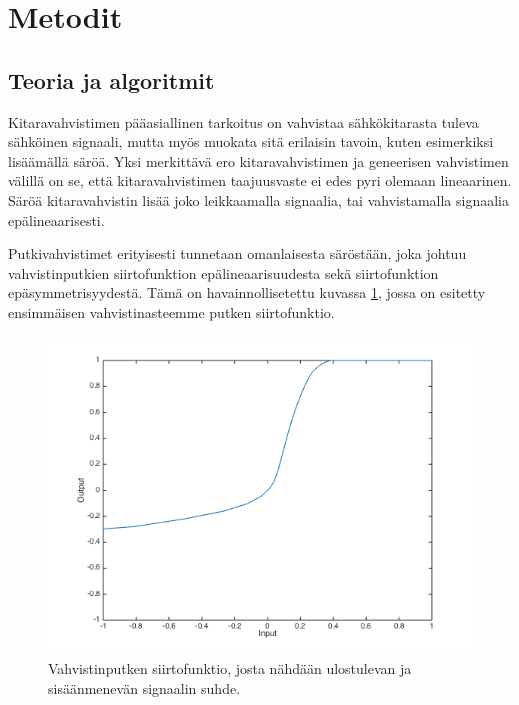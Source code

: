 \documentclass[11pt, a4paper, oneside]{article}
\begin{document}
\section{Metodit}

\subsection{Teoria ja algoritmit}

Kitaravahvistimen pääasiallinen tarkoitus on vahvistaa sähkökitarasta tuleva sähköinen signaali, mutta myös muokata sitä erilaisin tavoin, kuten esimerkiksi lisäämällä säröä. 
Yksi merkittävä ero kitaravahvistimen ja geneerisen vahvistimen välillä on se, että kitaravahvistimen taajuusvaste ei edes pyri olemaan lineaarinen. 
Säröä kitaravahvistin lisää joko leikkaamalla signaalia, tai vahvistamalla signaalia epälineaarisesti. \cite{dafx}

Putkivahvistimet erityisesti tunnetaan omanlaisesta säröstään, joka johtuu vahvistinputkien siirtofunktion epälineaarisuudesta sekä siirtofunktion epäsymmetrisyydestä. 
Tämä on havainnollisetettu kuvassa \ref{fig:tube_transf}, jossa on esitetty ensimmäisen vahvistinasteemme putken siirtofunktio. \cite{dafx}

\begin{figure}[h!]
\includegraphics[width=1\textwidth, center]{tube_transf.png} \newline
\caption{Vahvistinputken siirtofunktio, josta nähdään ulostulevan ja sisäänmenevän signaalin suhde.}
\label{fig:tube_transf}
\end{figure}
\end{document}
